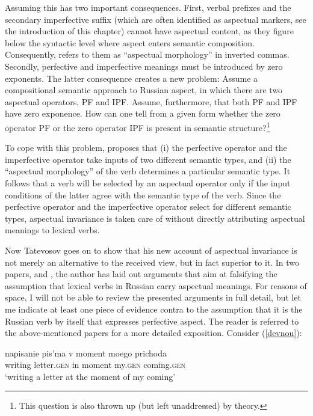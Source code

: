 \documentclass[output=paper,colorlinks,citecolor=brown]{langscibook}
\begin{document}
Assuming this has two important consequences. First, verbal prefixes and the secondary imperfective suffix (which are often identified as aspectual markers, see the introduction of this chapter) cannot have aspectual content, as they figure below the syntactic level where aspect enters semantic composition. Consequently, \citet{Tate17} refers to them as ``aspectual morphology'' in inverted commas. Secondly, 
perfective and imperfective meanings must be introduced by zero exponents. The latter consequence creates a new problem: Assume a compositional semantic approach to Russian aspect, in which there are two aspectual operators, PF and IPF.
Assume, furthermore, that both PF and IPF have zero exponence.
How can one tell from a given form whether the zero operator PF or the zero operator IPF is present in semantic structure?\footnote{This question is also thrown up (but left unaddressed) by  theory.} 

To cope with this problem, \citet{Tate17} proposes that (i) the perfective operator and the imperfective operator take inputs of two different semantic types, and (ii) the ``aspectual morphology'' of the verb determines a particular semantic type.
It follows that a verb will be selected by an aspectual operator only if the input conditions of the latter agree with the semantic type of the verb. Since the perfective operator and the imperfective operator select for different semantic types, 
aspectual invariance is taken care of without directly attributing aspectual meanings to lexical verbs.

Now Tatevosov goes on to show that his new account of aspectual invariance is not merely an alternative to the received view, but in fact superior to it. In two papers, \citet{Tatevosov2011} and \citet{Tate15}, the author has laid out arguments that aim at falsifying the assumption that lexical verbs in Russian carry aspectual meanings.
For reasons of space, I will not be able to review the presented arguments in full detail, but let me indicate at least one piece of evidence contra to the assumption that 
it is the Russian verb by itself that expresses perfective aspect.
The reader is referred to the above-mentioned papers for a more detailed exposition. Consider (\ref{devnou}):

\ea\label{devnou}
\gll napisanie pis'ma v moment moego prichoda\\
writing letter.\textsc{gen} in moment my.\textsc{gen} coming.\textsc{gen}\\
\glt `writing a letter at the moment of my coming' 
\z
\end{document}
